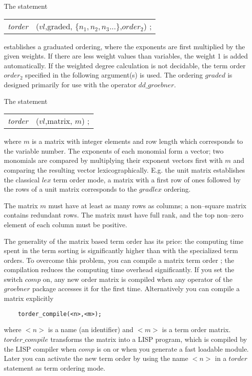  
The statement
\begin{center}
\begin{tabular}{cl}
{\it torder} &($vl$,graded, $\{n_1,n_2,n_3 \ldots\}$,$order_2$) ; \\
\end{tabular}
\end{center}
establishes a graduated ordering, where the exponents are first
multiplied by the given weights. If there are less weight values than
variables, the weight 1 is added automatically. If the weighted
degree calculation is not decidable, the term order $order_2$ specified
in the following argument(s) is used.  The ordering $graded$ is designed
primarily for use with the operator $dd\_groebner$.

 
The statement
\begin{center}
\begin{tabular}{cl}
{\it torder} &($vl$,matrix, $m$) ; \\
\end{tabular}
\end{center}
where $m$ is a matrix with integer elements and row length which
corresponds to the variable number. The exponents of each monomial
form a vector; two monomials are compared by multiplying their
exponent vectors first with $m$ and comparing the resulting vector
lexicographically. E.g. the unit matrix establishes the classical
$lex$ term order mode, a matrix with a first row of ones followed
by the rows of a unit matrix corresponds to the $gradlex$ ordering.

The matrix $m$ must have at least as many rows as columns; a non--square
matrix contains redundant rows. The matrix must have full rank, and
the top non--zero element of each column must be positive.

The generality of the matrix based term order has its price: the
computing time spent in the term sorting is significantly higher
than with the specialized term orders. To overcome this problem,
you can compile a matrix term order ; the
compilation reduces the computing time overhead significantly.
If you set the switch $comp$ on, any new order matrix is compiled
when any operator of the $groebner$ package accesses it for the
first time. Alternatively you can compile a matrix explicitly
\begin{verbatim}
    torder_compile(<n>,<m>);
\end{verbatim}
where $<n>$ is a name (an identifier) and $<m>$ is a term order matrix.
$torder\_compile$ transforms the matrix into a LISP program, which
is compiled by the LISP compiler when $comp$ is on or when you
generate a fast loadable module. Later you can activate the new term
order by using the name $<n>$ in a $torder$ statement as term ordering
mode.

